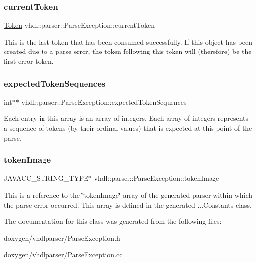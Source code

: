 \subsubsection{\texorpdfstring{currentToken}{currentToken}}
{\footnotesize\ttfamily \mbox{\hyperlink{classvhdl_1_1parser_1_1_token}{Token}} vhdl\+::parser\+::\+Parse\+Exception\+::current\+Token}

This is the last token that has been consumed successfully. If this object has been created due to a parse error, the token following this token will (therefore) be the first error token. \mbox{\label{classvhdl_1_1parser_1_1_parse_exception_a28848a83d7553352654dd5ccb7ed40ef}} 
\subsubsection{\texorpdfstring{expectedTokenSequences}{expectedTokenSequences}}
{\footnotesize\ttfamily int$\ast$$\ast$ vhdl\+::parser\+::\+Parse\+Exception\+::expected\+Token\+Sequences}

Each entry in this array is an array of integers. Each array of integers represents a sequence of tokens (by their ordinal values) that is expected at this point of the parse. \mbox{\label{classvhdl_1_1parser_1_1_parse_exception_a59256facf9b653896026ab05f0eb4728}} 
\subsubsection{\texorpdfstring{tokenImage}{tokenImage}}
{\footnotesize\ttfamily J\+A\+V\+A\+C\+C\+\_\+\+S\+T\+R\+I\+N\+G\+\_\+\+T\+Y\+PE$\ast$ vhdl\+::parser\+::\+Parse\+Exception\+::token\+Image}

This is a reference to the \char`\"{}token\+Image\char`\"{} array of the generated parser within which the parse error occurred. This array is defined in the generated ...Constants class. 

The documentation for this class was generated from the following files\+:\begin{DoxyCompactItemize}
\item 
doxygen/vhdlparser/Parse\+Exception.\+h\item 
doxygen/vhdlparser/Parse\+Exception.\+cc\end{DoxyCompactItemize}
